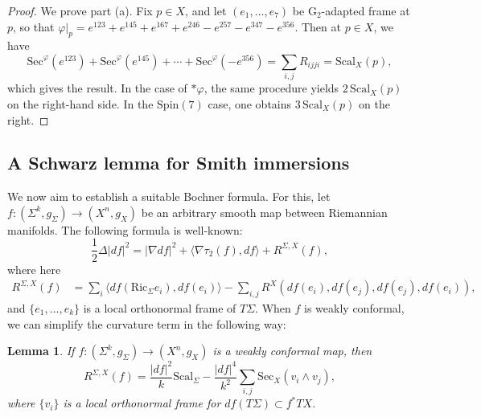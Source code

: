 \documentclass[11pt]{article}
\newcommand{\Spin}{\mathrm{Spin}}
\newtheorem{lem}[thm]{Lemma}
\theoremstyle{definition}
\numberwithin{equation}{section}
\begin{document}
\begin{proof} We prove part (a).  Fix $p \in X$, and let $(e_1, \ldots, e_7)$ be $\mathrm{G}_2$-adapted frame at $p$, so that $\varphi|_p = e^{123} + e^{145} + e^{167} + e^{246} - e^{257} - e^{347} - e^{356}$.  Then at $p \in X$, we have
$$\mathrm{Sec}^\varphi(e^{123}) + \mathrm{Sec}^\varphi(e^{145}) + \cdots + \mathrm{Sec}^\varphi(-e^{356}) = \sum_{i,j} R_{ijji} = \mathrm{Scal}_X(p),$$
which gives the result. In the case of $\ast \varphi$, the same procedure yields $2\,\mathrm{Scal}_X(p)$ on the right-hand side.  In the $\Spin(7)$ case, one obtains $3\,\mathrm{Scal}_X(p)$ on the right.
\end{proof}

\subsection{A Schwarz lemma for Smith immersions} \label{sub:Schwarz}

\indent \indent We now aim to establish a suitable Bochner formula.  For this, let $f \colon (\Sigma^k, g_\Sigma) \to (X^n, g_X)$ be an arbitrary smooth map between Riemannian manifolds.  The following formula is well-known:
\begin{equation}
\frac{1}{2}\Delta |df|^2 = \left| \nabla df \right|^2 + \langle \nabla \tau_2(f), df \rangle + R^{\Sigma, X}(f), \label{eq:ClassicBochner}
\end{equation}
where here
\begin{align*}
R^{\Sigma, X}(f) & = \sum_i \langle df(\mathrm{Ric}_\Sigma e_i), df(e_i) \rangle - \sum_{i,j} R^X( df(e_i), df(e_j), df(e_j), df(e_i)),
\end{align*}
and $\{e_1, \ldots, e_k\}$ is a local orthonormal frame of $T\Sigma$.  When $f$ is weakly conformal, we can simplify the curvature term in the following way:

\begin{lem} \label{prop:Classic-Bochner} If $f \colon (\Sigma^k, g_\Sigma) \to (X^n, g_X)$ is a weakly conformal map, then
\begin{equation} \label{eq:ConformalCurvature}
R^{\Sigma, X}(f) = \frac{|df|^2}{k}\mathrm{Scal}_\Sigma - \frac{|df|^4}{k^2} \sum_{i,j} \mathrm{Sec}_X( v_i \wedge v_j),
\end{equation}
where $\{v_i\}$ is a local orthonormal frame for $df(T\Sigma) \subset f^*TX$.
\end{lem}
\end{document}

